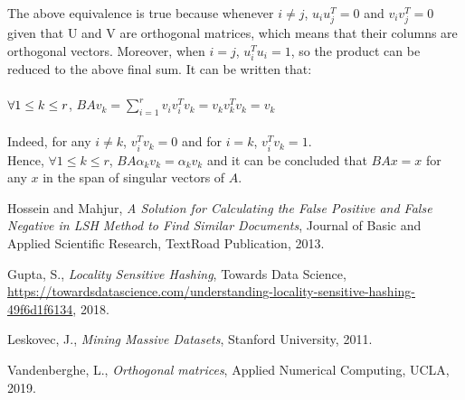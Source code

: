 \documentclass[]{report}
\begin{document}
The above equivalence is true because whenever $i \ne j$, $u_i u_j^T = 0$ and $v_i v_j^T = 0$ given that U and V are orthogonal matrices, which means that their columns are orthogonal vectors. Moreover, when $i = j$, $u_i^T u_i = 1$, so the product can be reduced to the above final sum. It can be written that:\\\\
$\forall \space 1 \le k \le r$, $BAv_k = \sum_{i=1}^{r} v_i v_i^T v_k = v_k v_k^T v_k = v_k$\\\\
Indeed, for any $i \ne k$, $v_i^T v_k = 0$ and for $i = k$, $v_i^T v_k = 1$.\\ Hence, $\forall 1 \le k \le r$, $BA \alpha_k v_k = \alpha_k v_k$ and it can be concluded that $BAx = x$ for any $x$ in the span of singular vectors of $A$.
\clearpage

\begin{thebibliography}{9}
	Hossein and Mahjur, 
	\textit{A Solution for Calculating the False Positive and False Negative in LSH Method to Find Similar Documents},
	Journal of Basic and Applied Scientific Research, TextRoad Publication,
	2013.
	
	Gupta, S.,
	\textit{Locality Sensitive Hashing},
	Towards Data Science,
	\url{https://towardsdatascience.com/understanding-locality-sensitive-hashing-49f6d1f6134},
	2018.
	
	Leskovec, J.,
	\textit{Mining Massive Datasets},
	Stanford University,
	2011.
	
	Vandenberghe, L.,
	\textit{Orthogonal matrices},
	Applied Numerical Computing, UCLA,
	2019.	
	
	
	
\end{thebibliography}
\end{document}
